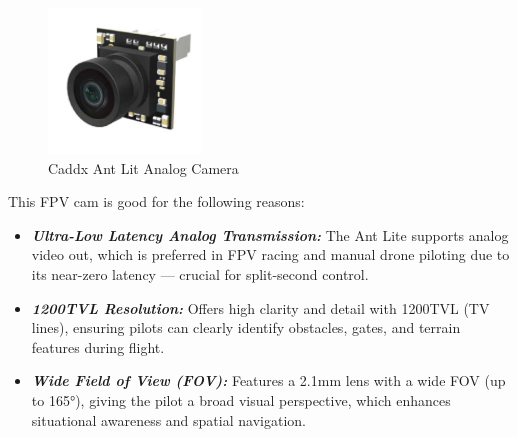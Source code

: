 \documentclass[12pt]{report}
\begin{document}
        \begin{figure}
          \includegraphics[width=1\linewidth]{fpvcam.png}
          \caption{Caddx Ant Lit Analog Camera}
          \label{fig:fpvcam}
        \end{figure}

        This FPV cam is good for the following reasons:
        \begin{itemize}
          \item \textbf{\textit{Ultra-Low Latency Analog Transmission:}} The Ant Lite supports analog video out, which is preferred in FPV racing and manual drone piloting due to its near-zero latency — crucial for split-second control.
          \item \textbf{\textit{1200TVL Resolution:}} Offers high clarity and detail with 1200TVL (TV lines), ensuring pilots can clearly identify obstacles, gates, and terrain features during flight.
          \item \textbf{\textit{Wide Field of View (FOV):}} Features a 2.1mm lens with a wide FOV (up to 165°), giving the pilot a broad visual perspective, which enhances situational awareness and spatial navigation.
        \end{itemize}
        \clearpage
\end{document}

